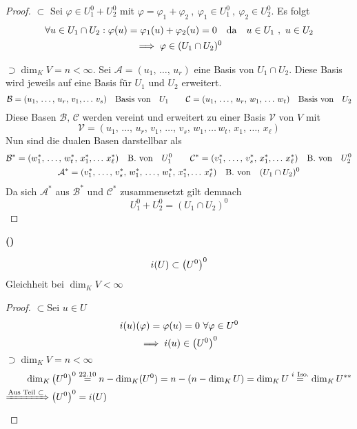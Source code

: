 \documentclass[a4paper, 12pt]{scrartcl}
\newcounter{taski}
\newcounter{taskii}[taski]
\newcommand{\ttask}{\stepcounter{taskii}\textbf{(\alph{taskii})}~}
\begin{document}
\begin{proof}
\glqq $\subset$\grqq \quad
Sei $\varphi \in U_1^0 + U_2^0$ mit $\varphi = \varphi_1 + \varphi_2 ~,~ \varphi_1 \in U_1^0 ~,~ \varphi_2 \in U_2^0$. Es folgt
\begin{gather*}
    \forall u \in U_1 \cap U_2 : \varphi(u) = \varphi_1(u) + \varphi_2(u) = 0 \qq{da} u \in U_1 ~,~ u \in U_2 \\
    \implies \varphi \in (U_1 \cap U_2)^0
\end{gather*}

\glqq $\supset$\grqq \quad $\dim_K V = n < \infty$. Sei $\mathcal{A} = (u_1,\,\dots,\,u_r)$ eine Basis von $U_1 \cap U_2$. Diese Basis wird jeweils auf eine Basis für $U_1$ und $U_2$ erweitert.
\[ \mathcal{B} = (u_1,\,\dots,\,u_r,\,v_1,\dots\,v_s) \qq{Basis von} U_1 \qquad \mathcal{C} = (u_1,\,\dots,\,u_r,\,w_1,\,\dots\,w_t) \qq{Basis von} U_2  \]
Diese Basen $\mathcal{B},\,\mathcal{C}$ werden vereint und erweitert zu einer Basis $\mathcal{V}$ von $V$ mit
\[ \mathcal{V} = (u_1,\,\dots,\,u_r,\,v_1,\,\dots,\,v_s,\,w_1,\dots\,w_t,\,x_1,\,\dots,\,x_\ell) \]
Nun sind die dualen Basen darstellbar als
\begin{gather*}
    \mathcal{B}^* = (w_1^*,\,\dots,\,w_t^*,\,x^*_1,\dots\,x_\ell^*) \qq{B. von} U_1^0 \qquad
    \mathcal{C}^* = (v_1^*,\,\dots,\,v_s^*,\,x^*_1,\dots\,x_\ell^*) \qq{B. von} U_2^0 \\
    \mathcal{A}^* = (v_1^*,\,\dots,\,v_s^*,\,w_1^*,\,\dots,\,w_t^*,\,x^*_1,\dots\,x_\ell^*) \qq{B. von} (U_1 \cap U_2)^0
\end{gather*}
Da sich $\mathcal{A}^*$ aus $\mathcal{B}^*$ und $\mathcal{C}^*$ zusammensetzt gilt demnach
\[ U_1^0 + U_2^0 = (U_1 \cap U_2)^0 \]
\end{proof}
\newpage
\ttask
\begin{theorem}
    \[ i(U) \subset \qty(U^0)^0 \]
    Gleichheit bei $\dim_K V < \infty$
\end{theorem}
\begin{proof}
\glqq$\subset$\grqq \quad Sei $u \in U$
\begin{gather*}
    i(u)(\varphi) = \varphi(u) = 0 ~\forall \varphi \in U^0 \\
    \implies i(u) \in \qty(U^0)^0
\end{gather*}
\glqq$\supset$\grqq \quad $\dim_K V = n < \infty$
\begin{align*}
    \dim_K \qty(U^0)^0 &\overset{22.10}= n - \dim_K (U^0) = n - \qty(n - \dim_K U) = \dim_K U \overset{i~\text{Iso.}}= \dim_K U^{**} \\
    \xRightarrow{\text{Aus Teil~} \subset} \qty(U^0)^0 &= i(U)
\end{align*}
\end{proof}
\end{document}
